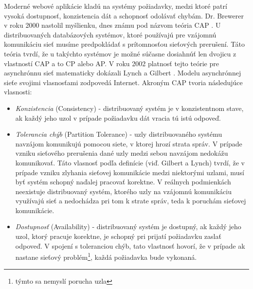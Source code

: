 \documentclass[11pt,twoside,a4paper]{book}
\begin{document}
Moderné webové aplikácie kladú na systémy požiadavky, medzi ktoré patrí vysoká dostupnosť, konzistencia dát a schopnosť odolávať chybám. Dr. Brewerer v roku 2000 nastolil myšlienku, dnes známu pod názvom teória CAP \cite{brewer2000towards}. U distribuovaných databázových systémov, ktoré používajú pre vzájomnú komunikáciu sieť musíme predpokládať s prítomnosťou sieťových prerušení. Táto teória tvrdí, že u takýchto systémov je možné súčasne dosiahnúť len dvojicu z vlastností CAP a to CP alebo AP. V roku 2002 platnosť tejto teórie pre asynchrónnu sieť matematicky dokázali Lynch a Gilbert \cite{Gilbert:2002:BCF:564585.564601}. Modelu asynchrónnej sieťe svojimi vlasnosťami zodpovedá Internet. Akroným CAP tvoria následujúce vlasnosti:
\begin{itemize}
 \item 
  \emph{Konzistencia} (Consistency) - distribuovaný systém je v konzistentnom stave, ak každý jeho uzol v prípade požiadavku dát vracia tú istú odpoveď.

\item
  \emph{Tolerancia chýb} (Partition Tolerance) - uzly distribuovaného systému navzájom komunikujú pomocou siete, v ktorej hrozí strata správ. V prípade vzniku sieťového prerušenia dané uzly medzi sebou navzájom nedokážu komunikovať. Táto vlasnosť podľa definície (viď. Gilbert a Lynch) tvrdí, že v prípade vzniku zlyhania sieťovej komunikácie medzi niektorými uzlami, musí byť systém schopný naďalej pracovať korektne. V reálnych podmienkách neexistuje distribuovaný systém, ktorého uzly na vzájomnú komunikáciu využívajú sieť a nedochádza pri tom k strate správ, teda k poruchám sieťovej komunikácie.

\item
  \emph{Dostupnosť} (Availability) - distribuovaný systém je dostupný, ak každý jeho uzol, ktorý pracuje korektne, je schopný pri prijatí požiadavku zaslať odpoveď. V spojení s toleranciou chýb, tato vlastnosť hovorí, že v prípade ak nastane sieťový problém\footnote{týmto sa nemyslí porucha uzla}, každá požiadavka bude vykonaná.

\end{itemize}
\end{document}
